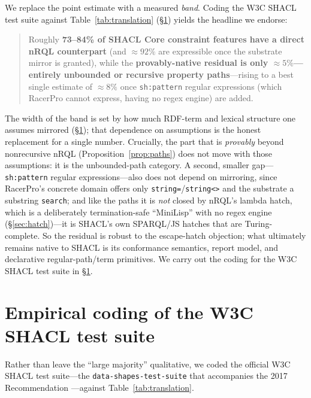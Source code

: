 \documentclass[11pt,letterpaper]{article}
\theoremstyle{definition}
\newcommand{\nrql}{nRQL}
\newcommand{\shacl}{SHACL}
\newcommand{\rdf}{RDF}
\begin{document}
We replace the point estimate with a measured \emph{band}. Coding the W3C \shacl{} test suite against Table~\ref{tab:translation} (\S\ref{sec:empirical}) yields the headline we endorse:
\begin{quote}
Roughly \textbf{73--84\% of \shacl{} Core constraint features have a direct \nrql{} counterpart} (and $\approx\!92\%$ are expressible once the substrate mirror is granted), while the \textbf{provably-native residual is only $\approx\!5\%$---entirely unbounded or recursive property paths}---rising to a best single estimate of $\approx\!8\%$ once \texttt{sh:pattern} regular expressions (which RacerPro cannot express, having no regex engine) are added.
\end{quote}
The width of the band is set by how much \rdf{}-term and lexical structure one assumes mirrored (\S\ref{sec:empirical}); that dependence on assumptions is the honest replacement for a single number. Crucially, the part that is \emph{provably} beyond nonrecursive \nrql{} (Proposition~\ref{prop:paths}) does not move with those assumptions: it is the unbounded-path category. A second, smaller gap---\texttt{sh:pattern} regular expressions---also does not depend on mirroring, since RacerPro's concrete domain offers only \texttt{string=}/\texttt{string<>} and the substrate a substring \texttt{search}; and like the paths it is \emph{not} closed by \nrql{}'s lambda hatch, which is a deliberately termination-safe ``MiniLisp'' with no regex engine (\S\ref{sec:hatch})---it is \shacl{}'s own SPARQL/JS hatches that are Turing-complete. So the residual is robust to the escape-hatch objection; what ultimately remains native to \shacl{} is its conformance semantics, report model, and declarative regular-path/term primitives. We carry out the coding for the W3C \shacl{} test suite in \S\ref{sec:empirical}.

\section{Empirical coding of the W3C SHACL test suite}\label{sec:empirical}

Rather than leave the ``large majority'' qualitative, we coded the official W3C \shacl{} test suite---the \texttt{data-shapes-test-suite} that accompanies the 2017 Recommendation \cite{shacl}---against Table~\ref{tab:translation}.
\end{document}
